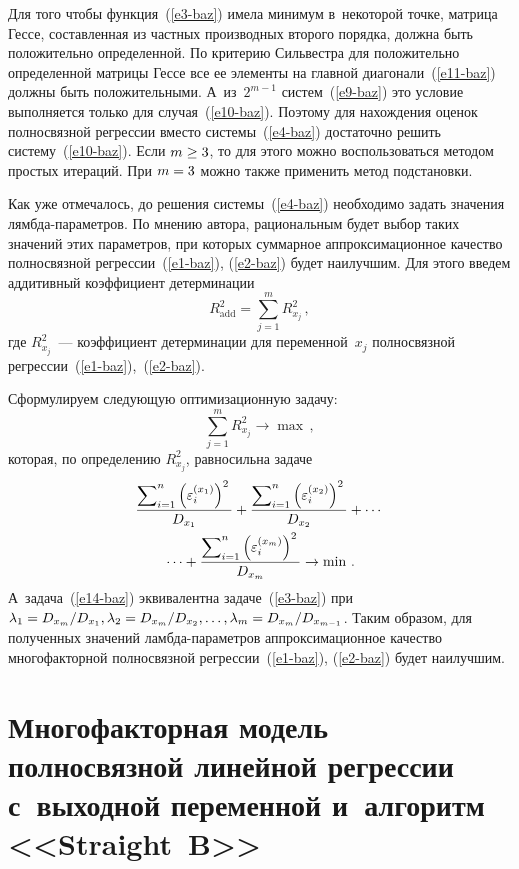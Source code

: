 \begin{multicols}{2}
  Для того чтобы функция~(\ref{e3-baz}) имела минимум в~некоторой точке, 
матрица Гессе, составленная из частных производных второго порядка, должна 
быть положительно определенной. По критерию Сильвестра для положительно 
определенной мат\-ри\-цы Гессе все ее элементы на главной  
диагонали~(\ref{e11-baz}) должны быть положительными. А~из~$2^{m-1}$ 
систем~(\ref{e9-baz}) это условие выполняется только для случая~(\ref{e10-baz}). 
Поэтому для нахождения оценок полносвязной регрессии вместо 
системы~(\ref{e4-baz}) достаточно решить систему~(\ref{e10-baz}). Если 
$m\hm\geq 3$, то для этого можно воспользоваться методом простых итераций. 
При $m\hm=3$ можно также применить метод подстановки.
  
  Как уже отмечалось, до решения системы~(\ref{e4-baz}) необходимо задать 
значения лямб\-да-па\-ра\-мет\-ров. По мнению автора, рациональным будет 
выбор таких значений этих параметров, при которых суммарное 
аппроксимационное качество полносвязной регрессии~(\ref{e1-baz}),  
(\ref{e2-baz}) будет наилучшим. Для этого введем аддитивный коэффициент 
детерминации
  \begin{equation*}
  R^2_{\mathrm{add}}  =\sum\limits^m_{j=1} R^2_{x_j}\,,
  \end{equation*}
где $R^2_{x_j}$~--- коэффициент детерминации для переменной~$x_j$ 
полносвязной регрессии~(\ref{e1-baz}),~(\ref{e2-baz}).

  Сформулируем следующую оптимизационную задачу:
  \begin{equation*}
  \sum\limits^m_{j=1} R^2_{x_j}\to \max\,,
  \end{equation*}
которая, по определению $R^2_{x_j}$, равносильна задаче
\begin{multline}
\displaystyle\frac{\displaystyle \sum\nolimits^n_{i=1}\left(\varepsilon_i^{(x_1)}\right)^2\mathstrut}{\displaystyle D_{x_1}\mathstrut} +
\displaystyle\frac{\displaystyle \sum\nolimits^n_{i=1}\left(\varepsilon_i^{(x_2)}\right)^2\mathstrut}{\displaystyle D_{x_2}\mathstrut}+\cdots{} \\{}\cdots +
\displaystyle\frac{\displaystyle \sum\nolimits^n_{i=1}\left(\varepsilon_i^{(x_m)}\right)^2\mathstrut}{\displaystyle D_{x_m}\mathstrut}\to  \min\,.
\label{e14-baz}
\end{multline}
    А~задача~(\ref{e14-baz}) эквивалентна задаче~(\ref{e3-baz}) при 
$\lambda_1\hm= D_{x_m}/D_{x_1}, \lambda_2= D_{x_m}/D_{x_2}, \ldots, 
\lambda_m\hm=D_{x_m}/D_{x_{m-1}}$. Таким образом, для полученных 
значений ламб\-да-па\-ра\-мет\-ров аппроксимационное качество многофакторной 
полносвязной регрессии~(\ref{e1-baz}), (\ref{e2-baz}) будет наилучшим.

\section{Многофакторная модель полносвязной линейной 
регрессии с~выходной переменной и~алгоритм <<Straight~B>>}


\end{multicols}
